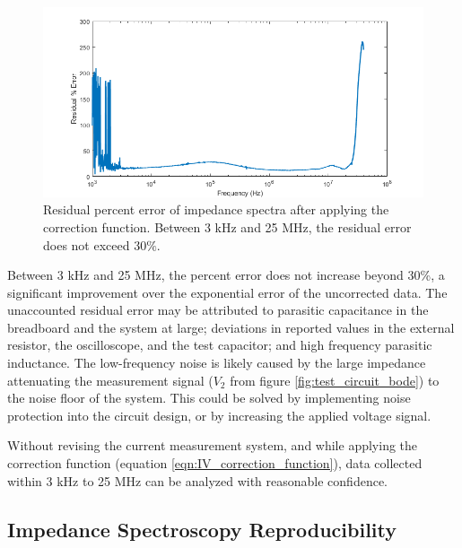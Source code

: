 \begin{figure}[H]
    \centering
    \includegraphics[width=\textwidth]{images/residualPercentError.png}
    \caption[Residual percent error of impedance spectra after applying the correction function.]{Residual percent error of impedance spectra after applying the correction function. Between 3 kHz and 25 MHz, the residual error does not exceed 30$\%$.}
    \label{fig:IS_residual_error}
\end{figure}


\par Between 3 kHz and 25 MHz, the percent error does not increase beyond 30\%, a significant improvement over the exponential error of the uncorrected data. The unaccounted residual error may be attributed to parasitic capacitance in the breadboard and the system at large; deviations in reported values in the external resistor, the oscilloscope, and the test capacitor; and high frequency parasitic inductance. The low-frequency noise is likely caused by the large impedance attenuating the measurement signal ($V_2$ from figure \ref{fig:test_circuit_bode}) to the noise floor of the system. This could be solved by implementing noise protection into the circuit design, or by increasing the applied voltage signal. 

\par Without revising the current measurement system, and while applying the correction function (equation \ref{eqn:IV_correction_function}), data collected within 3 kHz to 25 MHz can be analyzed with reasonable confidence. 

\FloatBarrier

\clearpage

\subsection{Impedance Spectroscopy Reproducibility}

